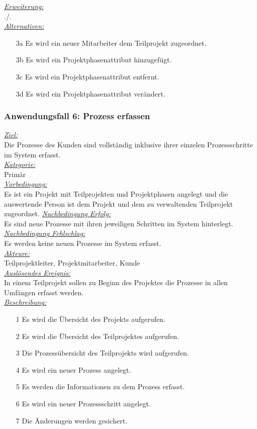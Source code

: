\underline{\emph{Erweiterung:}} \\
./.\\
\underline{\emph{Alternativen:}} \\
\begin{itemize}
    \item [3a] Es wird ein neuer Mitarbeiter dem Teilprojekt zugeordnet.
    \item [3b] Es wird ein Projektphasenattribut hinzugefügt. 
    \item [3c] Es wird ein Projektphasenattribut entfernt.
    \item [3d] Es wird ein Projektphasenattribut verändert.
\end{itemize}

\subsubsection{Anwendungsfall 6: Prozess erfassen}
\underline{\emph{Ziel:}}\\
Die Prozesse des Kunden sind vollständig inklusive ihrer einzelen Prozessschritte im System erfasst.\\
\underline{\emph{Kategorie:}} \\
Primär\\
\underline{\emph{Vorbedingung:}} \\
Es ist ein Projekt mit Teilprojekten und Projektphasen angelegt und die auswertende Person ist dem Projekt und dem zu verwaltenden Teilprojekt zugeordnet.
\underline{\emph{Nachbedingung Erfolg:}} \\
Es sind neue Prozesse mit ihren jeweiligen Schritten im System hinterlegt.\\
\underline{\emph{Nachbedingung Fehlschlag:}} \\
Es werden keine neuen Prozesse im System erfasst.\\
\underline{\emph{Akteure:}} \\
Teilprojektleiter, Projektmitarbeiter, Kunde\\
\underline{\emph{Auslösendes Ereignis:}} \\
In einem Teilprojekt sollen zu Beginn des Projektes die Prozesse in allen Umfängen erfasst werden.\\
\underline{\emph{Beschreibung:}}
\begin{itemize}
    \item [1] Es wird die Übersicht des Projekts aufgerufen.
    \item [2] Es wird die Übersicht des Teilprojektes aufgerufen.
    \item [3] Die Prozessübersicht des Teilprojekts wird aufgerufen.
    \item [4] Es wird ein neuer Prozess angelegt.
    \item [5] Es werden die Informationen zu dem Prozess erfasst.
    \item [6] Es wird ein neuer Prozessschritt angelegt.
    \item [7] Die Änderungen werden gesichert.
\end{itemize}

